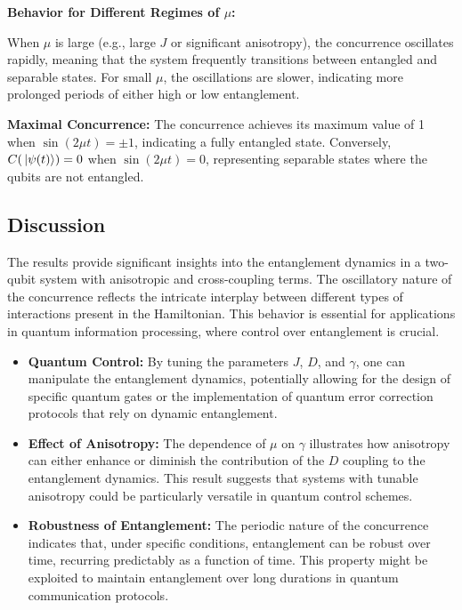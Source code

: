  \textbf{Behavior for Different Regimes of \(\mu\):}

 When \(\mu\) is large (e.g., large \(J\) 
        or significant anisotropy), the concurrence oscillates 
        rapidly, meaning that the system frequently transitions 
        between entangled and separable states. For small \(\mu\), the oscillations are slower, 
        indicating more prolonged periods of either high or low entanglement.

\textbf{Maximal Concurrence:}
 The concurrence achieves its maximum value of 1 when \(\sin(2 \mu t) = \pm 1\), indicating a fully entangled state.
 Conversely, \(C(\ket*{\psi(t)}) = 0\) when \(\sin(2 \mu t) = 0\), representing separable states where the qubits are not entangled.

\subsection{Discussion}

The results provide significant insights into the entanglement 
dynamics in a two-qubit system with anisotropic and cross-coupling terms. 
The oscillatory nature of the concurrence reflects the intricate interplay 
between different types of interactions present in the Hamiltonian. 
This behavior is essential for applications in quantum information 
processing, where control over entanglement is crucial.

\begin{itemize}
    \item \textbf{Quantum Control:} By tuning the parameters 
    \(J\), \(D\), and \(\gamma\), one can manipulate 
    the entanglement dynamics, potentially allowing for 
    the design of specific quantum gates or the 
    implementation of quantum error correction protocols that rely on dynamic entanglement.

    \item \textbf{Effect of Anisotropy:} The dependence of \(\mu\) on 
    \(\gamma\) illustrates how anisotropy can either enhance or diminish 
    the contribution of the \(D\) coupling to the entanglement dynamics. 
    This result suggests that systems with tunable anisotropy could be 
    particularly versatile in quantum control schemes.

    \item \textbf{Robustness of Entanglement:} The periodic nature of the concurrence indicates that, under specific conditions, entanglement can be robust over time, recurring predictably as a function of time. This property might be exploited to maintain entanglement over long durations in quantum communication protocols.
\end{itemize}

